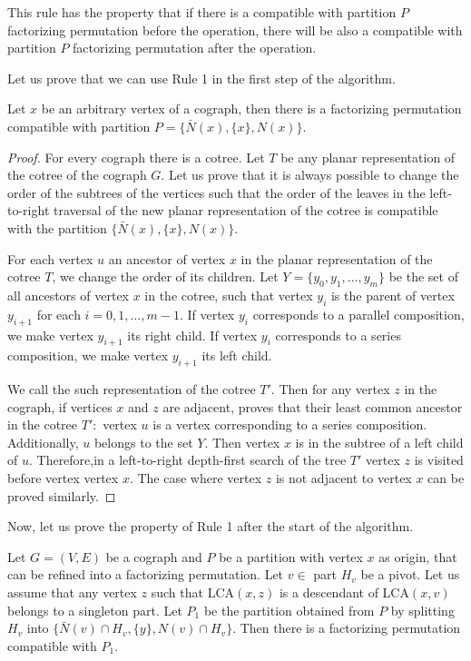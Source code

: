 This rule has the property that if there is a compatible with partition $P$ factorizing permutation before the operation, there will be also a compatible with partition $P$ factorizing permutation after the operation.

Let us prove that we can use Rule 1 in the first step of the algorithm.

\begin{theorem}
  Let $x$ be an arbitrary vertex of a cograph, then there is a factorizing permutation compatible with partition  $P= \{  \bar{N}(x), \{x\}, N(x) \}$.
  \label{Starting case for the Rule 1}
\end{theorem}

\begin{proof}
For every cograph there is a cotree. Let $T$ be any planar representation of the cotree of the cograph $G$. Let us prove that it is always possible to change the order of the subtrees of the vertices such that the order of the leaves in the left-to-right traversal of the new planar representation of the cotree is compatible with the partition $\{\bar{N}(x), \{x\}, N(x)\}$.

For each vertex $u$  an ancestor of vertex $x$ in the planar representation of the cotree $T$, we change the order of its children. Let $Y=\{y_0, y_1, \dots, y_m \}$ be the set of all ancestors of vertex $x$ in the cotree, such that vertex $y_i$ is the parent of vertex $y_{i+1}$ for each $i = 0, 1, \dots, m-1$. If vertex $y_i$ corresponds to a parallel composition, we make vertex $y_{i+1}$ its right child. If vertex $y_i$ corresponds to a series composition, we make vertex 
$y_{i+1}$ its left child.

We call the such representation of the cotree $T'$. Then for any vertex $z$ in the cograph, if vertices $x$ and $z$ are adjacent,  proves that their least common ancestor in the cotree $T' \colon$ vertex $u$ is a vertex corresponding to a series composition. Additionally, $u$ belongs to the set $Y$. Then vertex $x$ is in the subtree of a left child of $u$. Therefore,in a left-to-right depth-first search of the tree $T'$ vertex $z$ is visited before vertex vertex $x$. The case where vertex 
$z$ is not adjacent to vertex $x$ can be proved similarly.
\end{proof}

Now, let us prove the property of Rule 1 after the start of the algorithm.


\begin{theorem}
    Let $G=(V,E)$ be a cograph and $P$ be a partition with vertex $x$ as origin, that can be refined into a factorizing permutation. Let $v \in $ part $H_v$ be a pivot. Let us assume that any vertex $z$ such that LCA$(x,z)$ is a descendant of
LCA$(x, v)$ belongs to a singleton part. Let $P_1$ be the partition obtained from $P$ by splitting $H_v$ into $\{\bar{N}(v) \cap H_v, \{y\}, N(v) \cap H_v \}$. Then there is a factorizing permutation compatible with $P_1$.
\label{General case for the Rule 1}
\end{theorem}



